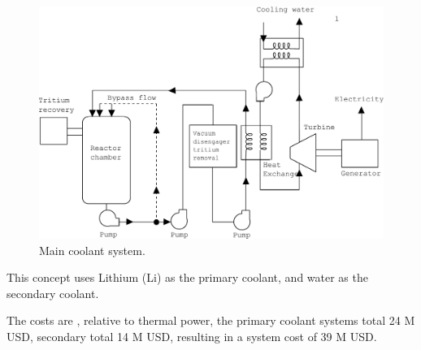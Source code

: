 \begin{figure}[h!]  
\centering  
\includegraphics[width=0.8\linewidth]{StandardFigures/steamPbLi-eps-converted-to.pdf}
\caption{Main coolant system.}
\label{fig:coola}
\end{figure} 

This concept uses Lithium (Li) as the primary coolant, and water as the secondary coolant. 

The costs are , relative to thermal power, the primary coolant systems total 24 M USD, secondary total 14 M USD, resulting in a system cost of 39 M USD. 